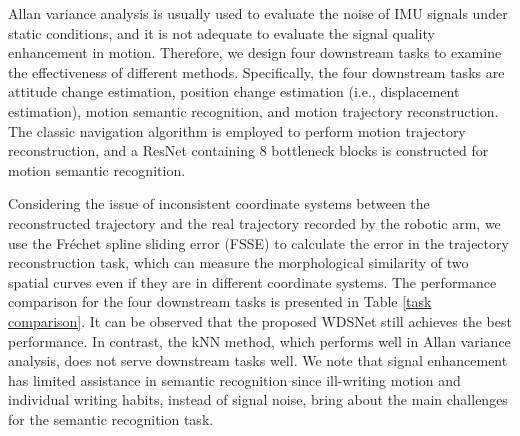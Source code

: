 \documentclass[letterpaper]{article} %
\begin{document}


	Allan variance analysis is usually used to evaluate the noise of IMU signals under static conditions, and it is not adequate to evaluate the signal quality enhancement in motion. Therefore, we design four downstream tasks to examine the effectiveness of different methods. Specifically, the four downstream tasks are attitude change estimation, position change estimation (i.e., displacement estimation), motion semantic recognition, and motion trajectory reconstruction. The classic navigation algorithm is employed to perform motion trajectory reconstruction, and a ResNet containing 8 bottleneck blocks is constructed for motion semantic recognition.


	Considering the issue of inconsistent coordinate systems between the reconstructed trajectory and the real trajectory recorded by the robotic arm, we use the Fréchet spline sliding error (FSSE) \cite{10080916} to calculate the error in the trajectory reconstruction task, which can measure the morphological similarity of two spatial curves even if they are in different coordinate systems.
	The performance comparison for the four downstream tasks is presented in Table \ref{task comparison}.
	It can be observed that the proposed WDSNet still achieves the best performance. In contrast, the kNN method, which performs well in Allan variance analysis, does not serve downstream tasks well. We note that signal enhancement has limited assistance in semantic recognition since ill-writing motion and individual writing habits, instead of signal noise, bring about the main challenges for the semantic recognition task.
\end{document}
